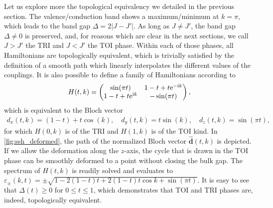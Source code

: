 Let us explore more the topological equivalency we detailed in the previous section.
The valence/conduction band shows a maximum/minimum at $k=\pi$, which leads to the band gap $\Delta = 2\left|J-J'\right|$.
As long as $J\neq J'$, the band gap $\Delta\neq0$ is preserved, and, for reasons which are clear in the next sections, we call $J>J'$ the TRI and $J<J'$ the TOI phase.
Within each of those phases, all Hamiltonians are topologically equivalent, which is trivially satisfied by the definition of a smooth path which linearly interpolates the different values of the couplings.
It is also possible to define a family of Hamiltonians according to
\begin{align}
    H(t,k) =
    \begin{pmatrix}
        \sin(\pi t) & 1-t + t\mathrm e^{-\mathrm i k} \\
        1-t + t\mathrm e^{\mathrm i k} & -\sin(\pi t)
    \end{pmatrix},
    \label{eq:hamiltonian_path}
\end{align}
which is equivalent to the Bloch vector
\begin{align}
    d_x(t,k) = (1-t)+t\cos(k),
    \quad
    d_y(t,k) = t\sin(k),
    \quad
    d_z(t,k) = \sin(\pi t),
\end{align}
for which $H(0,k)$ is of the TRI and $H(1,k)$ is of the TOI kind.
In \cref{fig:ssh_deformed}, the path of the normalized Bloch vector $\hat{\bm d}(t,k)$ is depicted.
If we allow the deformation along the $z$-axis, the cycle that is drawn in the TOI phase can be smoothly deformed to a point without closing the bulk gap.
The spectrum of $H(t,k)$ is readily solved and evaluates to $\varepsilon_\pm(k,t)=\pm\sqrt{1-2(1-t)t+2(1-t)t\cos k+\sin(\pi t)}$.
It is easy to see that $\Delta({t})\geq0$ for $0\leq t\leq1$, which demonstrates that TOI and TRI phases are, indeed, topologically equivalent.
